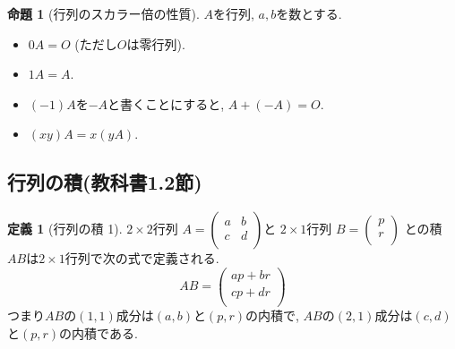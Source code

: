 \documentclass[dvipdfmx,a4paper,11pt]{article}
\theoremstyle{definition}
\newtheorem{prop}[thm]{命題}
\newtheorem{dfn}[thm]{定義}
\begin{document}
 
 
 
 \begin{tcolorbox}[
    colback = white,
    colframe = green!35!black,
    fonttitle = \bfseries,
    breakable = true]
    \begin{prop}[行列のスカラー倍の性質]
$A$を行列, $a,b$を数とする.
 \begin{itemize}
 	\setlength{\parskip}{0cm}
  	\setlength{\itemsep}{0pt} 
 \item $0A =O$ (ただし$O$は零行列).
  \item $1A=A$. 
  \item $(-1)A$を$-A$と書くことにすると, $A + (-A) =O$.　
  \item $(xy) A = x(yA)$.
 \end{itemize}
  \end{prop}
 \end{tcolorbox}
 
 \subsection{行列の積(教科書1.2節)}
 
  \begin{tcolorbox}[
    colback = white,
    colframe = green!35!black,
    fonttitle = \bfseries,
    breakable = true]
    \begin{dfn}[行列の積 1]
    
$2 \times 2$行列
$
A=\begin{pmatrix}
a& b \\
c& d \\
\end{pmatrix}
$と 
$2 \times 1$行列
$
B=
\begin{pmatrix}
p \\
r\\
\end{pmatrix}
$
との積$AB$は$2 \times 1$行列で次の式で定義される.
$$
AB =
\begin{pmatrix}
ap + br \\
cp + dr\\
\end{pmatrix}
$$
つまり$AB$の$(1,1)$成分は$(a,b)$と$(p,r)$の内積で, $AB$の$(2,1)$成分は$(c,d)$と$(p,r)$の内積である. 
  \end{dfn}
 \end{tcolorbox}
 
\end{document}
